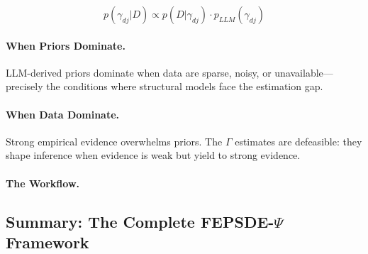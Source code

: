 \begin{equation}
  p(\gamma_{dj} | D) \propto p(D | \gamma_{dj}) \cdot p_{LLM}(\gamma_{dj})
\end{equation}

\paragraph{When Priors Dominate.}
LLM-derived priors dominate when data are sparse, noisy, or unavailable---precisely the conditions
where structural models face the estimation gap.

\paragraph{When Data Dominate.}
Strong empirical evidence overwhelms priors. The $\Gamma$ estimates are defeasible:
they shape inference when evidence is weak but yield to strong evidence.

\paragraph{The Workflow.}
\begin{center}
\end{center}

\subsection{Summary: The Complete FEPSDE-$\Psi$ Framework}

